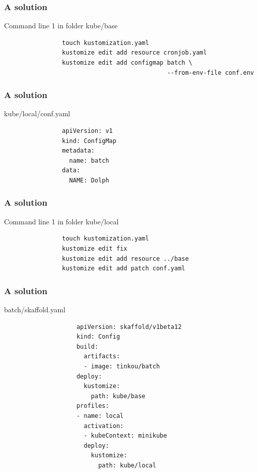 	\begin{frame}[fragile]
		\frametitle{A solution}

		\begin{block}{Command line 1 in folder kube/base}
			\begin{verbatim}
				touch kustomization.yaml
				kustomize edit add resource cronjob.yaml
				kustomize edit add configmap batch \
				                             --from-env-file conf.env
			\end{verbatim}
		\end{block}
	\end{frame}
	
	\begin{frame}[fragile]
		\frametitle{A solution}
		
		\begin{block}{kube/local/conf.yaml}
			\begin{verbatim}
				apiVersion: v1
				kind: ConfigMap
				metadata:
				  name: batch
				data:
				  NAME: Dolph
			\end{verbatim}
		\end{block}
	\end{frame}
	
	\begin{frame}[fragile]
		\frametitle{A solution}
		
		\begin{block}{Command line 1 in folder kube/local}
			\begin{verbatim}
				touch kustomization.yaml
				kustomize edit fix
				kustomize edit add resource ../base
				kustomize edit add patch conf.yaml
			\end{verbatim}
		\end{block}
	\end{frame}
	
	\begin{frame}[fragile]
		\frametitle{A solution}
		
		\begin{block}{batch/skaffold.yaml}
			\begin{footnotesize}
				\begin{verbatim}
					apiVersion: skaffold/v1beta12
					kind: Config
					build:
					  artifacts:
					  - image: tinkou/batch
					deploy:
					  kustomize:
					    path: kube/base
					profiles:
					- name: local
					  activation:
					  - kubeContext: minikube
					  deploy:
					    kustomize:
					      path: kube/local
				\end{verbatim}
			\end{footnotesize}
		\end{block}
	\end{frame}
	
